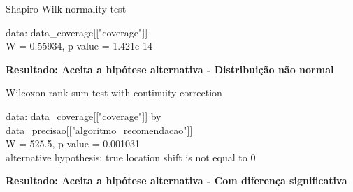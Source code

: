     Shapiro-Wilk normality test

\noindent
data:  data\_coverage[["coverage"]]\\
W = 0.55934, p-value = 1.421e-14

\textbf{Resultado: Aceita a hipótese alternativa - Distribuição não normal}

  Wilcoxon rank sum test with continuity correction

\noindent
data:  data\_coverage[["coverage"]] by \\
data\_precisao[["algoritmo\_recomendacao"]]\\
W = 525.5, p-value = 0.001031\\
alternative hypothesis: true location shift is not equal to 0

\textbf{Resultado: Aceita a hipótese alternativa - Com diferença significativa}
